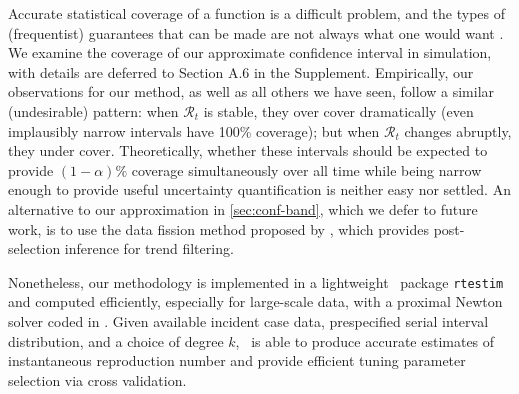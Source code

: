 Accurate statistical coverage of a function is a difficult problem, and the
types of (frequentist) guarantees that can be made are not always what one would
want \citep{genovese2008adaptive}. We examine the coverage of our approximate
confidence interval in simulation, with details are deferred to Section A.6 in the Supplement. Empirically, our observations for our method, as well as all
others we have seen, follow a similar (undesirable) pattern: when
$\mathcal{R}_t$ is stable, they over cover dramatically (even implausibly narrow
intervals have 100\% coverage); but when $\mathcal{R}_t$ changes abruptly, they
under cover. Theoretically, whether these intervals should be expected to
provide $(1-\alpha)\%$ coverage simultaneously over all time while being narrow
enough to provide useful uncertainty quantification is neither easy nor settled.
An alternative to our approximation in \autoref{sec:conf-band}, which we defer
to future work, is to use the data fission method proposed by
\cite{leiner2023data}, which provides post-selection inference for trend
filtering.


Nonetheless, our methodology is implemented in a lightweight \R\ package
\texttt{rtestim} and computed efficiently, especially for large-scale data, with
a proximal Newton solver coded in \cpp. Given available incident case data,
prespecified serial interval distribution, and a choice of degree $k$, \RtEstim\
is able to produce accurate estimates of instantaneous reproduction number and
provide efficient tuning parameter selection via cross validation. 
